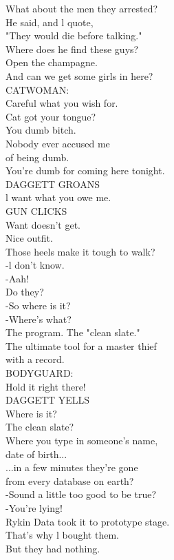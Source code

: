 \documentclass{article}
\begin{document}
\begin{multicols}{3}
What about the men they arrested?\\
He said, and l quote,\\
"They would die before talking."\\
Where does he find these guys?\\
Open the champagne.\\
And can we get some girls in here?\\
CATWOMAN:\\
Careful what you wish for.\\
Cat got your tongue?\\
You dumb bitch.\\
Nobody ever accused me\\
of being dumb.\\
You're dumb for coming here tonight.\\
DAGGETT GROANS\\
l want what you owe me.\\
GUN CLICKS\\
Want doesn't get.\\
Nice outfit.\\
Those heels make it tough to walk?\\
-l don't know.\\
-Aah!\\
Do they?\\
-So where is it?\\
-Where's what?\\
The program. The "clean slate."\\
The ultimate tool for a master thief\\
with a record.\\
BODYGUARD:\\
Hold it right there!\\
DAGGETT YELLS\\
Where is it?\\
The clean slate?\\
Where you type in someone's name,\\
date of birth...\\
...in a few minutes they're gone\\
from every database on earth?\\
-Sound a little too good to be true?\\
-You're lying!\\
Rykin Data took it to prototype stage.\\
That's why l bought them.\\
But they had nothing.\\

\end{multicols}
\end{document}
